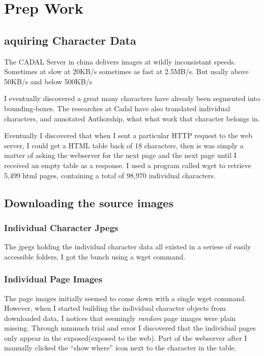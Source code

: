 \chapter{Prep Work}

\section{aquiring Character Data}

The CADAL Server in china delivers images at wildly inconsistant speeds.  Sometimes at slow at 20KB/s sometimes as fast at 2.5MB/s.  But usally above 50KB/s and below 500KB/s 

I eventually discovered a great many characters have already been segmented into bounding-boxes.  The researches at Cadal have also translated individual characters, and annotated Authorship, what what work that character belongs in.

Eventually I discovered that when I sent a particular HTTP request to the web server, I could get a HTML table back of 18 characters,  then is was simply a matter of asking the webserver for the next page and the next page until I received an empty table as a response.  I used a program called wget to retrieve 5,499 html pages, containing a total of 98,970 individual characters.



\section{Downloading the source images}

\subsection{Individual Character Jpegs}
The jpegs holding the individual character data all existed in a seriese of easily accessible folders,  I got the bunch using a wget command.

\subsection{Individual Page Images}
The page images initially seemed to come down with a single wget command.  However, when I started building the individual character objects from downloaded data, I notices that seemingly \textit{random} page images were plain missing.  Through mmmuch trial and error I discovered that the individual pages only appear in the exposed(exposed to the web).  Part of the webserver after I manually clicked the ``show where'' icon next to the character in the table.

